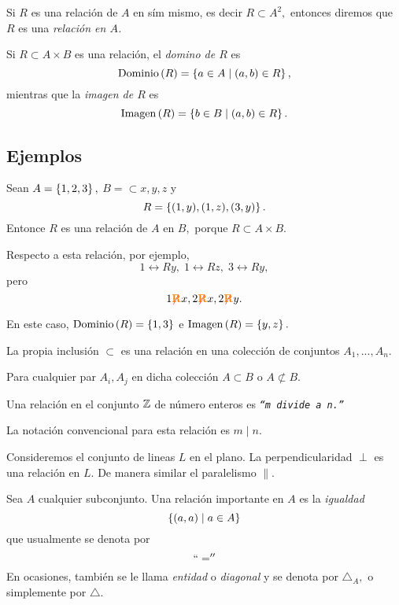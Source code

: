 	Si $R$ es una relación de $A$ en sím mismo, es decir $R \subset A^{2},$ entonces diremos que $R$ es una \emph{relación en $A$.}



	\begin{definicion}
		Si $R \subset A \times B$ es una relación, el \emph{domino de $R$} es 
		$$
		\operatorname{Dominio}\left( R \right)=\left\{ a\in A\mid (a,b)\in R \right\},
		$$ mientras que la \emph{imagen de $R$} es 
		$$
		\operatorname{Imagen}\left( R \right)=\left\{ b\in B\mid (a,b)\in R \right\}.
		$$
	\end{definicion}
	


\subsection{Ejemplos}

	Sean $A=\left\{ 1,2,3 \right\},$ $B=\subset{x,y,z}$ y $$R=\left\{ (1,y), (1,z), (3,y) \right\}.$$ Entonce $R$ es una relación de $A$ en $B,$ porque $R \subset A \times B.$
	
	
	Respecto a esta relación, por ejemplo,
	$$
	1\rel{R}y, \; 1\rel{R}z, \; 3\rel{R}y,
	$$ pero 
	$$
	1{ {\color{red}\not}{\color{orange}\textbf{R}} }x, 2{ {\color{red}\not}{\color{orange}\textbf{R}} }x, 2{ {\color{red}\not}{\color{orange}\textbf{R}} }y.
	$$
	
	
	En este caso, $\operatorname{Dominio}\left( R \right)=\left\{ 1,3 \right\}$ e $\operatorname{Imagen}\left( R \right)=\left\{ y,z \right\}.$



	La propia inclusión $\subset$ es una relación en una colección de conjuntos $A_{1},...,A_{n}.$ 
	
	Para cualquier par $A_{i}, A_{j}$ en dicha colección $A \subset B$ o $A \not\subset B.$



	Una relación en el conjunto $\mathbb{Z}$ de número enteros es \emph{\texttt{``$m$ divide a $n.$''}}
	
	
	La notación convencional para esta relación es \emph{$m \mid n.$}



	Consideremos el conjunto de lineas $L$ en el plano. La perpendicularidad $\perp$ es una relación en $L.$  De manera similar el paralelismo $\parallel.$



	Sea $A$ cualquier subconjunto. Una relación importante en $A$ es la \emph{igualdad}
	$$
	\left\{ (a,a) \mid a \in A \right\}
	$$ que usualmente se denota por \emph{$$``=''$$} 
	 En ocasiones, tambi\'en se le llama \emph{entidad} o \emph{diagonal} y se denota por $\triangle_{A},$ o simplemente por $\triangle.$



